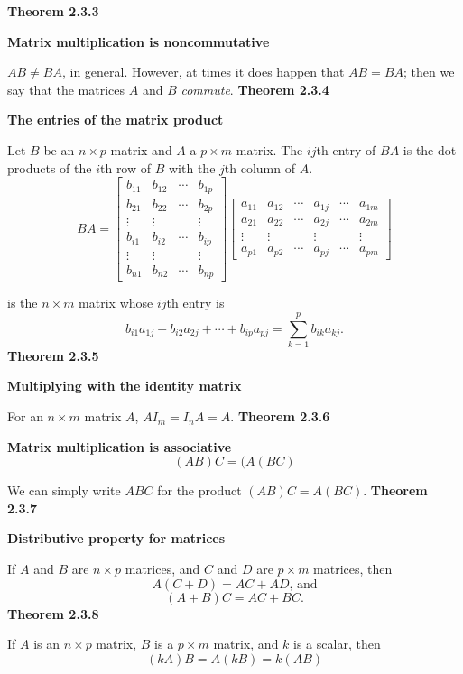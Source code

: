 \textbf{Theorem 2.3.3}\\
\par\noindent\textbf{Matrix multiplication is noncommutative}
\par\noindent $AB\ne{}BA$, in general. However, at times it does happen that $AB=BA$; then we say that the matrices $A$ and $B$ \textit{commute}.
\textbf{Theorem 2.3.4}\\
\par\noindent\textbf{The entries of the matrix product}
\par\noindent Let $B$ be an $n\times{}p$ matrix and $A$ a $p\times{}m$ matrix. The $ij$th entry of $BA$ is the dot products of the $i$th row of $B$ with the $j$th column of $A$.
\[BA=\left[\begin{array}{cccc}b_{11}&b_{12}&\cdots{}&b_{1p}\\ b_{21}&b_{22}&\cdots{}&b_{2p}\\ \vdots{}&\vdots{}&&\vdots{}\\ b_{i1}&b_{i2}&\cdots{}&b_{ip}\\ \vdots{}&\vdots{}&&\vdots{}\\ b_{n1}&b_{n2}&\cdots{}&b_{np}\end{array}\right]\left[\begin{array}{cccccc}a_{11}&a_{12}&\cdots{}&a_{1j}&\cdots{}&a_{1m}\\ a_{21}&a_{22}&\cdots{}&a_{2j}&\cdots{}&a_{2m}\\ \vdots{}&\vdots{}&&\vdots{}&&\vdots{}\\ a_{p1}&a_{p2}&\cdots{}&a_{pj}&\cdots{}&a_{pm}\end{array}\right]\]
\par\noindent is the $n\times{}m$ matrix whose $ij$th entry is
\[b_{i1}a_{1j}+b_{i2}a_{2j}+\cdots{}+b_{ip}a_{pj}=\sum_{k=1}^{p}b_{ik}a_{kj}.\]
\textbf{Theorem 2.3.5}\\
\par\noindent\textbf{Multiplying with the identity matrix}
\par\noindent For an $n\times{}m$ matrix $A$, $AI_{m}=I_{n}A=A$.
\textbf{Theorem 2.3.6}\\
\par\noindent\textbf{Matrix multiplication is associative}
\[(AB)C=(A(BC)\]
\par\noindent We can simply write $ABC$ for the product $(AB)C=A(BC)$.
\textbf{Theorem 2.3.7}\\
\par\noindent\textbf{Distributive property for matrices}
\par\noindent If $A$ and $B$ are $n\times{}p$ matrices, and $C$ and $D$ are $p\times{}m$ matrices, then 
\[A(C+D)=AC+AD\textrm{, and}\]
\[(A+B)C=AC+BC.\]
\textbf{Theorem 2.3.8}\\
\par\noindent If $A$ is an $n\times{}p$ matrix, $B$ is a $p\times{}m$ matrix, and $k$ is a scalar, then
\[(kA)B=A(kB)=k(AB)\]
\pagebreak

